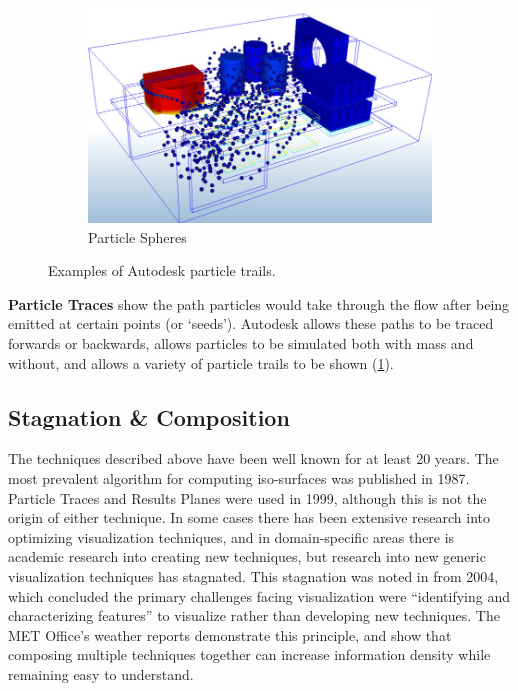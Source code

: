 \begin{figure}
    \begin{subfigure}{0.9\textwidth}%
        \includegraphics[width=\linewidth]{Ch20Research/figures/autodesk_particle_spheres.jpg}
        \caption{Particle Spheres}
    \end{subfigure}%
    \caption{Examples of Autodesk particle trails.}
    \label{fig:AutodeskCFDParticles}
\end{figure}

\textbf{Particle Traces} show the path particles would take through the flow after being emitted at certain points (or `seeds').
Autodesk allows these paths to be traced forwards or backwards, allows particles to be simulated both with mass and without, and allows a variety of particle trails to be shown (\cref{fig:AutodeskCFDParticles}).

\subsection{Stagnation \& Composition}
The techniques described above have been well known for at least 20 years.
The most prevalent algorithm for computing iso-surfaces was published in 1987\cite{LorensenMarching}.
Particle Traces and Results Planes were used in 1999\cite{Schulz1999}, although this is not the origin of either technique.
In some cases there has been extensive research into optimizing visualization techniques\cite{Ueng1996}, and in domain-specific areas there is academic research into creating new techniques\cite{Chen16}, but research into new generic visualization techniques has stagnated.
This stagnation was noted in \cite{vizRole2004} from 2004, which concluded the primary challenges facing visualization were ``identifying and characterizing features'' to visualize rather than developing new techniques.
The MET Office's weather reports demonstrate this principle, and show that composing multiple techniques together can increase information density while remaining easy to understand.

